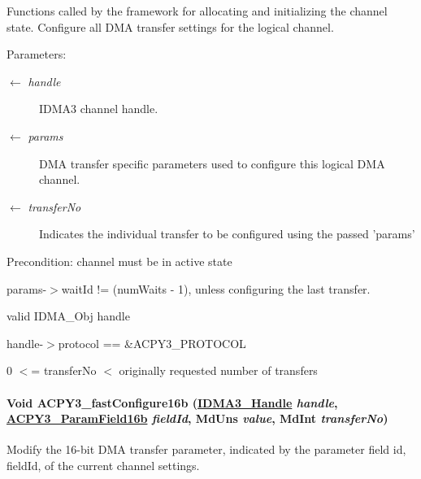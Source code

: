 Functions called by the framework for allocating and initializing the channel state. Configure all DMA transfer settings for the logical channel. 

\begin{Desc}
\item[Parameters:]
\begin{description}
\item[\mbox{$\leftarrow$} {\em handle}]IDMA3 channel handle. \item[\mbox{$\leftarrow$} {\em params}]DMA transfer specific parameters used to configure this logical DMA channel. \item[\mbox{$\leftarrow$} {\em transfer\-No}]Indicates the individual transfer to be configured using the passed 'params'\end{description}
\end{Desc}
\begin{Desc}
\item[Precondition:]channel must be in active state 

params-$>$wait\-Id != (num\-Waits - 1), unless configuring the last transfer. 

valid IDMA\_\-Obj handle 

handle-$>$protocol == \&ACPY3\_\-PROTOCOL 

0 $<$= transfer\-No $<$ originally requested number of transfers \end{Desc}
\hypertarget{group___d_s_p_a_c_p_y3_g2c54ca4dc3d0cf3f861259bc7cf0f8de}{
\paragraph[ACPY3\_\-fastConfigure16b]{\setlength{\rightskip}{0pt plus 5cm}Void ACPY3\_\-fast\-Configure16b (\hyperlink{struct_i_d_m_a3___obj}{IDMA3\_\-Handle} {\em handle}, \hyperlink{group___d_s_p_a_c_p_y3_gf9624d3d925ec0d15bd845967664e608}{ACPY3\_\-Param\-Field16b} {\em field\-Id}, Md\-Uns {\em value}, Md\-Int {\em transfer\-No})}\hfill}
\label{group___d_s_p_a_c_p_y3_g2c54ca4dc3d0cf3f861259bc7cf0f8de}


Modify the 16-bit DMA transfer parameter, indicated by the parameter field id, field\-Id, of the current channel settings. 

